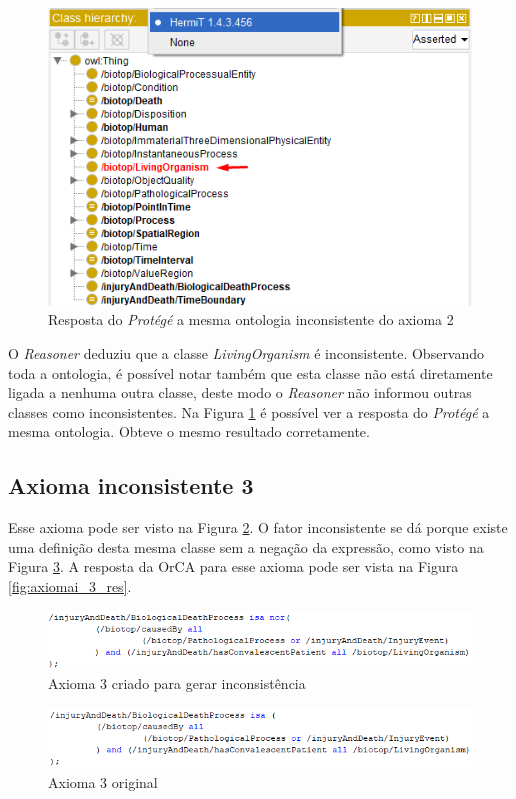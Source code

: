 \documentclass{bcc}
\begin{document}
\begin{figure}[H]
\centering
\includegraphics[width=.6\textwidth]{Figuras/axiomai_2_protege.png}
\caption{Resposta do \textit{Protégé} a mesma ontologia inconsistente do axioma 2} 
\label{fig:axiomai_2_protege}
\end{figure}

O \textit{Reasoner} deduziu que a classe \textit{LivingOrganism} é inconsistente. Observando toda a ontologia, é possível notar também que esta classe não está diretamente ligada a nenhuma outra classe, deste modo o \textit{Reasoner} não informou outras classes como inconsistentes. Na Figura \ref{fig:axiomai_2_protege} é possível ver a resposta do \textit{Protégé} a mesma ontologia. Obteve o mesmo resultado corretamente.

\subsection{Axioma inconsistente 3}
Esse axioma pode ser visto na Figura \ref{fig:axiomai_3}. O fator inconsistente se dá porque existe uma definição desta mesma classe sem a negação da expressão, como visto na Figura \ref{fig:axiomai_3_o}. A resposta da OrCA para esse axioma pode ser vista na Figura \ref{fig:axiomai_3_res}.

\begin{figure}[H]
\centering
\includegraphics[width=.8\textwidth]{Figuras/axiomai_3.png}
\caption{Axioma 3 criado para gerar inconsistência} 
\label{fig:axiomai_3}
\end{figure}

\begin{figure}[H]
\centering
\includegraphics[width=.8\textwidth]{Figuras/axiomai_3_o.png}
\caption{Axioma 3 original} 
\label{fig:axiomai_3_o}
\end{figure}
\end{document}
